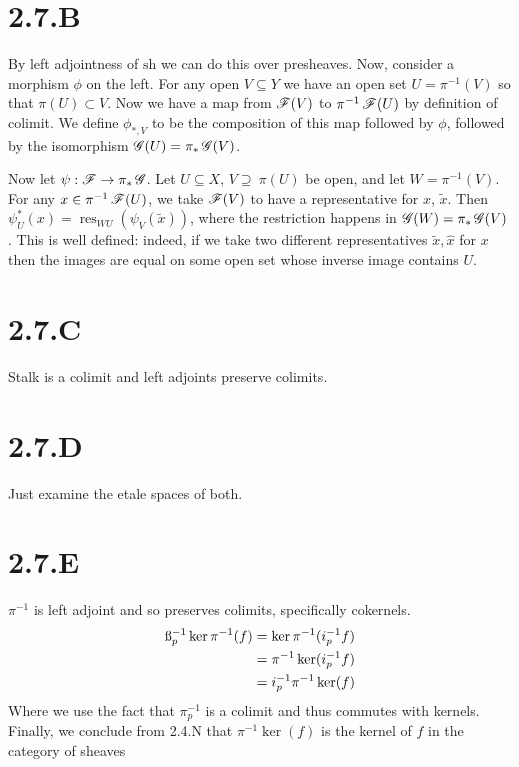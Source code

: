 \documentclass{article}
\begin{document}
\section*{2.7.B}
By left adjointness of $\text{sh}$ we can do this over presheaves. Now, consider a morphism $\phi$ on the left.
For any open $V \subseteq Y$ we have an open set $U=\pi^{-1}(V)$ so that $\pi(U) \subset V$.
Now we have a map from $\operatorname{\mathscr{F}}(V)$ to $\pi^{-1}\operatorname{\mathscr{F}}(U)$ by definition of colimit.
We define $\phi_{*,V}$ to be the composition of this map followed by $\phi$, followed by the isomorphism
$\operatorname{\mathscr{G}}(U)=\pi_*\operatorname{\mathscr{G}}(V)$.

Now let $\psi: \operatorname{\mathscr{F}} \to \pi_*\operatorname{\mathscr{G}}$. Let $U \subseteq X$, $V \supseteq \
    \pi(U)$ be open, and let $W=\pi^{-1}(V)$. For any $x \in \pi^{-1}\operatorname{\mathscr{F}}(U)$, we take $\operatorname{\mathscr{F}}(V)$
to have a representative for $x$, $\widetilde{x}$. Then
$\psi^*_U(x)=\operatorname{res}_{WU}(\psi_V(\widetilde{x}))$,
where the restriction happens in  $\operatorname{\mathscr{G}}(W)=\pi_*\operatorname{\mathscr{G}}(V)$. This is well defined:
indeed, if we take two different representatives $\widetilde{x}, \widehat{x}$ for $x$ then
the images are equal on some open set whose inverse image contains $U$.

\section*{2.7.C}
Stalk is a colimit and left adjoints preserve colimits.

\section*{2.7.D}
Just examine the etale spaces of both.

\section*{2.7.E}
$\pi^{-1}$ is left adjoint and so preserves colimits, specifically cokernels.
\begin{align*}
    \i_p^{-1}\ker\pi^{-1}(f) & = \ker\pi^{-1}(i_p^{-1}f) \\
                             & = \pi^{-1}\ker(i_p^{-1}f) \\
                             & = i_p^{-1}\pi^{-1}\ker(f)
\end{align*}
Where we use the fact that $\pi^{-1}_p$ is a colimit and thus commutes with kernels.
Finally, we conclude from 2.4.N that $\pi^{-1}\ker(f)$ is the kernel of $f$ in the category of sheaves
\end{document}

